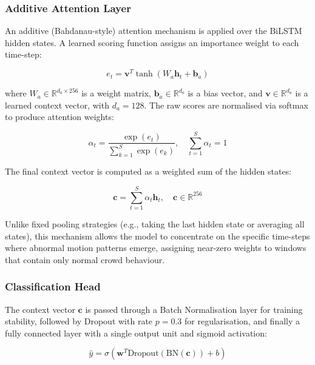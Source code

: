 \subsubsection{Additive Attention Layer}
An additive (Bahdanau-style) attention mechanism \cite{bahdanau2015neural} is applied over the BiLSTM hidden states. A learned scoring function assigns an importance weight to each time-step:

\begin{equation}
  e_t = \mathbf{v}^T \tanh\!\left(W_a \mathbf{h}_t + \mathbf{b}_a\right)
  \label{eq:attn_score}
\end{equation}

\noindent where $W_a \in \mathbb{R}^{d_a \times 256}$ is a weight matrix, $\mathbf{b}_a \in \mathbb{R}^{d_a}$ is a bias vector, and $\mathbf{v} \in \mathbb{R}^{d_a}$ is a learned context vector, with $d_a = 128$. The raw scores are normalised via softmax to produce attention weights:

\begin{equation}
  \alpha_t = \frac{\exp(e_t)}{\sum_{k=1}^{S} \exp(e_k)}, \quad \sum_{t=1}^{S} \alpha_t = 1
  \label{eq:attn_weights}
\end{equation}

The final context vector is computed as a weighted sum of the hidden states:

\begin{equation}
  \mathbf{c} = \sum_{t=1}^{S} \alpha_t \mathbf{h}_t, \quad \mathbf{c} \in \mathbb{R}^{256}
  \label{eq:context}
\end{equation}

Unlike fixed pooling strategies (e.g., taking the last hidden state or averaging all states), this mechanism allows the model to concentrate on the specific time-steps where abnormal motion patterns emerge, assigning near-zero weights to windows that contain only normal crowd behaviour.

\subsubsection{Classification Head}
The context vector $\mathbf{c}$ is passed through a Batch Normalisation layer for training stability, followed by Dropout with rate $p = 0.3$ for regularisation, and finally a fully connected layer with a single output unit and sigmoid activation:

\begin{equation}
  \hat{y} = \sigma\!\left(\mathbf{w}^T \text{Dropout}\!\left(\text{BN}(\mathbf{c})\right) + b\right)
  \label{eq:output}
\end{equation}


